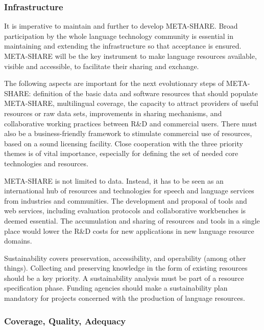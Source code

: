 \documentclass[10pt, plain]{../../metanetpaper}
\begin{document}
\begin{multicols}{2}
\subsubsection{Infrastructure}
\label{sec:infrastructure}

It is imperative to maintain and further to develop META-SHARE. Broad participation by the whole language technology community is essential in maintaining and extending the infrastructure so that acceptance is ensured. META-SHARE will be the key instrument to make language resources available, visible and accessible, to facilitate their sharing and exchange.

The following aspects are important for the next evolutionary steps of META-SHARE: definition of the basic data and software resources that should populate META-SHARE, multilingual coverage, the capacity to attract providers of useful resources or raw data sets, improvements in sharing mechanisms, and collaborative working practices between R\&D and commercial users. There must also be a business-friendly framework to stimulate commercial use of resources, based on a sound licensing facility. Close cooperation with the three priority themes is of vital importance, especially for defining the set of needed core technologies and resources.

META-SHARE is not limited to data. Instead, it has to be seen as an international hub of resources and technologies for speech and language services from industries and communities. The development and proposal of tools and web services, including evaluation protocols and collaborative workbenches is deemed essential. The accumulation and sharing of resources and tools in a single place would lower the R\&D costs for new applications in new language resource domains.

Sustainability covers preservation, accessibility, and operability (among other things). Collecting and preserving knowledge in the form of existing resources should be a key priority. A sustainability analysis must be part of a resource specification phase. Funding agencies should make a sustainability plan mandatory for projects concerned with the production of language resources.

\subsubsection{Coverage, Quality, Adequacy}
\label{sec:cover-qual-adeq}


\end{multicols}
\end{document}
